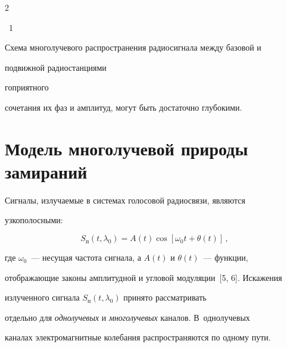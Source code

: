 \begin{multicols}{2}
\begin{center}
{}




\vspace*{6pt}


\end{center}


{{\figurename~1}\ \ \small{Схема многолучевого распространения радиосигнала между базовой и 


подвижной радиостанциями}}











\addtocounter{figure}{1}








\noindent 


гоприятного 


сочетания их фаз и амплитуд, могут быть достаточно глубокими. 





\section{Модель многолучевой природы замираний}





     Сигналы, излучаемые в системах голосовой радиосвязи, являются 


узкополосными:


     $$


     S_{\mathrm{п}}(t,\lambda_0)=A(t)\cos\left[\omega_0t+\theta(t)\right]\,,


     $$


где $\omega_0$~--- несущая частота сигнала, а $A(t)$ и $\theta(t)$~--- функции, 


отображающие законы амплитудной и угловой модуляции~[5, 6]. Искажения 


излученного сигнала $ S_{\mathrm{п}}(t,\lambda_0)$ принято рассматривать 


отдельно для \textit{однолучевых} и \textit{многолучевых} каналов. В~однолучевых 


каналах электромагнитные колебания распространяются по одному пути. 



\end{multicols}
